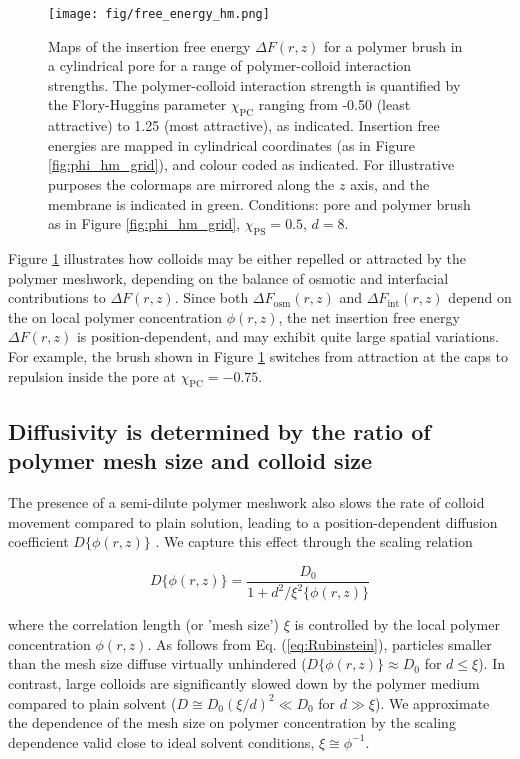\documentclass[12pt, a4paper]{article}
\begin{document}
\begin{figure}
    \centering
    \texttt{[image: fig/free\_energy\_hm.png]}
    \caption{
    Maps of the insertion free energy $\Delta F(r,z)$ for a polymer brush in a cylindrical pore for a range of polymer-colloid interaction strengths. 
    The polymer-colloid interaction strength is quantified by the Flory-Huggins parameter $\chi_{\text{PC}}$ ranging from -0.50 (least attractive) to 1.25 (most attractive), as indicated. 
    Insertion free energies are mapped in cylindrical coordinates (as in Figure \ref{fig:phi_hm_grid}), and colour coded as indicated. 
    For illustrative purposes the colormaps are mirrored along the $z$ axis, and the membrane is indicated in green. 
    Conditions: pore and polymer brush as in Figure \ref{fig:phi_hm_grid}, $\chi_{\text{PS}}=0.5$, $d=8$.
    }
    \label{fig:DeltaF_map}
\end{figure}

Figure \ref{fig:DeltaF_map} illustrates how colloids may be either repelled or attracted by the polymer meshwork, 
depending on the balance of osmotic and interfacial contributions to $\Delta F(r,z)$. 
Since both $\Delta F_{\text{osm}}(r,z)$ and $\Delta F_{\text{int}}(r,z)$ depend on the on local polymer concentration $\phi(r,z)$, 
the net insertion free energy $\Delta F(r,z)$ is position-dependent, and may exhibit quite large spatial variations. 
For example, the brush shown in Figure \ref{fig:DeltaF_map} switches from attraction at the caps to repulsion inside the pore at $\chi_{\text{PC}}=-0.75$.


\subsection{Diffusivity is determined by the ratio of polymer mesh size and colloid size}

The presence of a semi-dilute polymer meshwork also slows the rate of colloid movement compared to plain solution, leading to a position-dependent diffusion coefficient $D\{\phi(r,z)\}$ \cite{Laktionov2023}. 
We capture this effect through the scaling relation

\begin{equation}
    D\{\phi(r,z)\} = \frac{D_0}{1+d^2/\xi^{2}\{\phi(r,z)\}}
    \label{eq:Rubinstein}
\end{equation}

\noindent where the correlation length (or 'mesh size') $\xi$ is controlled by the local polymer concentration $\phi(r,z)$. 
As follows from Eq. (\ref{eq:Rubinstein}), particles smaller than the mesh size diffuse virtually unhindered ($D\{\phi(r,z)\}\approx D_0$ for $d\leq \xi$). 
In contrast, large colloids are significantly slowed down by the polymer medium compared to plain solvent ($D\cong D_0 (\xi/d)^2\ll D_0$ for $d\gg \xi$). 
We approximate the dependence of the mesh size on polymer concentration by the scaling dependence valid close to ideal solvent conditions, $\xi\cong \phi^{-1}$. 
\end{document}
